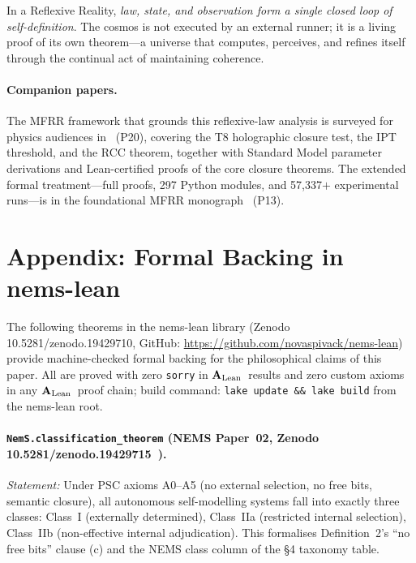 \documentclass[11pt]{article}
\newcommand{\CatAL}{\ensuremath{\textbf{A}_{\rm Lean}}}
\begin{document}
In a Reflexive Reality, \emph{law, state, and observation form a single
closed loop of self-definition}.
The cosmos is not executed by an external runner; it is a living proof
of its own theorem---a universe that computes, perceives, and refines
itself through the continual act of maintaining coherence.

\paragraph{Companion papers.}
The MFRR framework that grounds this reflexive-law analysis is surveyed
for physics audiences in~\cite{SpivackPhysicsPortal} (P20), covering
the T8 holographic closure test, the IPT threshold, and the RCC theorem,
together with Standard Model parameter derivations and Lean-certified
proofs of the core closure theorems.
The extended formal treatment---full proofs, 297 Python modules, and
57,337$+$ experimental runs---is in the foundational MFRR
monograph~\cite{SpivackMFRR} (P13).

\appendix
\section*{Appendix: Formal Backing in nems-lean}

The following theorems in the nems-lean library (Zenodo
10.5281/\allowbreak zenodo.19429710, GitHub:
\url{https://github.com/novaspivack/nems-lean}) provide machine-checked
formal backing for the philosophical claims of this paper. All are
proved with zero \texttt{sorry} in \CatAL\ results and zero custom axioms in any \CatAL\ proof chain; build command:
\texttt{lake update \&\& lake build} from the nems-lean root.

\begin{sloppypar}
\paragraph{\texttt{NemS.classification\_theorem} (NEMS Paper~02,
Zenodo 10.5281/\allowbreak zenodo.19429715~\cite{SpivackNEMSTheorem}).}
\textit{Statement:} Under PSC axioms A0--A5 (no external selection,
no free bits, semantic closure), all autonomous self-modelling systems
fall into exactly three classes: Class~I (externally determined),
Class~IIa (restricted internal selection), Class~IIb (non-effective
internal adjudication). This formalises Definition~2's ``no free bits''
clause (c) and the NEMS class column of the §4 taxonomy table.
\end{sloppypar}
\end{document}
